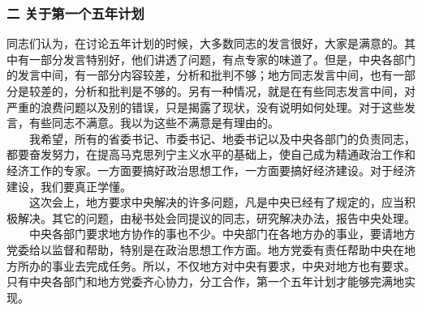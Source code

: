 \documentclass[cn,11pt,chinese]{elegantbook}
\def\myformat#1{\hfil\hfil #1}
\begin{document}
\subsubsection*{\myformat{二 关于第一个五年计划}}
同志们认为，在讨论五年计划的时候，大多数同志的发言很好，大家是满意的。其中有一部分发言特别好，他们讲透了问题，有点专家的味道了。但是，中央各部门的发言中间，有一部分内容较差，分析和批判不够；地方同志发言中间，也有一部分是较差的，分析和批判是不够的。另有一种情况，就是在有些同志发言中间，对严重的浪费问题以及别的错误，只是揭露了现状，没有说明如何处理。对于这些发言，有些同志不满意。我以为这些不满意是有理由的。\\
　　我希望，所有的省委书记、市委书记、地委书记以及中央各部门的负责同志，都要奋发努力，在提高马克思列宁主义水平的基础上，使自己成为精通政治工作和经济工作的专家。一方面要搞好政治思想工作，一方面要搞好经济建设。对于经济建设，我们要真正学懂。\\
　　这次会上，地方要求中央解决的许多问题，凡是中央已经有了规定的，应当积极解决。其它的问题，由秘书处会同提议的同志，研究解决办法，报告中央处理。\\
　　中央各部门要求地方协作的事也不少。中央部门在各地方办的事业，要请地方党委给以监督和帮助，特别是在政治思想工作方面。地方党委有责任帮助中央在地方所办的事业去完成任务。所以，不仅地方对中央有要求，中央对地方也有要求。只有中央各部门和地方党委齐心协力，分工合作，第一个五年计划才能够完满地实现。\\
\end{document}
